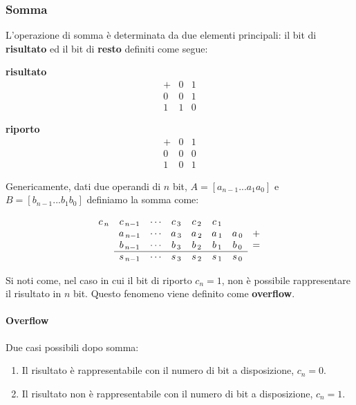 \documentclass[oneside]{scrbook}
\begin{document}
\subsubsection{Somma}
L'operazione di somma è determinata da due elementi principali: il bit di \textbf{risultato} ed il bit di \textbf{resto} definiti come segue:
\begin{center}
    \begin{minipage}[t]{0.45\textwidth}
        \centering
        \textbf{risultato}
        \[
        \begin{array}{c|cc}
             + & 0 & 1 \\
            \hline
            0 & 0 & 1 \\
            1 & 1 & 0
        \end{array}
        \]
    \end{minipage}%
    \begin{minipage}[t]{0.45\textwidth}
        \centering
        \textbf{riporto}
        \[
        \begin{array}{c|cc}
             + & 0 & 1 \\
            \hline
            0 & 0 & 0 \\
            1 & 0 & 1
        \end{array}
        \]
    \end{minipage}
\end{center}
Genericamente, dati due operandi di $n$ bit, $A = [a_{n-1}...a_1a_0]$ e $B = [b_{n-1}...b_1b_0]$ definiamo la somma come:

\[
\begin{array}{*7{c}c} 
    c_{\,n} & c_{\,n-1} & \cdots & c_{\,3} & c_{\,2} & c_{\,1} & \phantom{a_0} & \\
    \phantom{c_n} & a_{\,n-1} & \cdots & a_{\,3} & a_{\,2} & a_{\,1} & a_{\,0} & + \\
    & b_{\,n-1} & \cdots & b_{\,3} & b_{\,2} & b_{\,1} & b_{\,0} & = \\
    \cline{2-7}
    \phantom{+} & s_{\,n-1} & \cdots & s_{\,3} & s_{\,2} & s_{\,1} & s_{\,0} &
\end{array}
\]

Si noti come, nel caso in cui il bit di riporto $c_n = 1$, non è possibile rappresentare il risultato in $n$ bit. Questo fenomeno viene definito come \textbf{overflow}.

\paragraph{Overflow}
Due casi possibili dopo somma:
\begin{enumerate}
    \item Il risultato è rappresentabile con il numero di bit a disposizione, $c_n = 0$.
    \item Il risultato non è rappresentabile con il numero di bit a disposizione, $c_n = 1$.
\end{enumerate}
\end{document}
